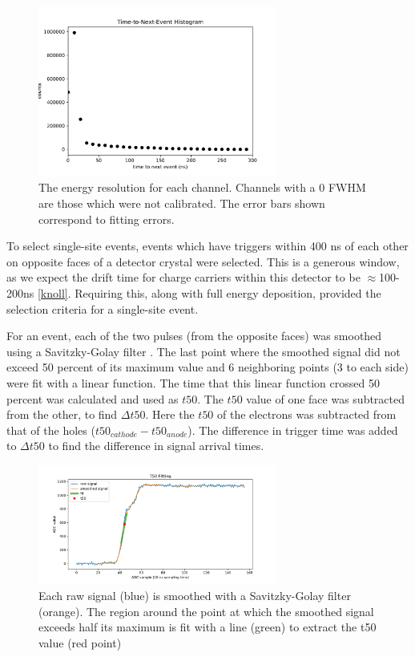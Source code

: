 \begin{figure}
\begin{centering}
\includegraphics[width=0.7\textwidth]{./figures/time-to-next-event.pdf}
\caption{The energy resolution for each channel. Channels with a 0 FWHM are those which were not calibrated. The error bars shown correspond to fitting errors.}
\label{timehist}
\end{centering}
\end{figure}

To select single-site events, events which have triggers within 400 ns of each other on opposite faces of a detector crystal were selected. This is a generous window, as we expect the drift time for charge carriers within this detector to be $\approx$100-200ns \ref{knoll}. Requiring this, along with full energy deposition, provided the selection criteria for a single-site event.

For an event, each of the two pulses (from the opposite faces) was smoothed using a Savitzky-Golay filter \cite{scipy}. The last point where the smoothed signal did not exceed 50 percent of its maximum value and 6 neighboring points (3 to each side) were fit with a linear function. The time that this linear function crossed 50 percent was calculated and used as $t50$. The $t50$ value of one face was subtracted from the other, to find $\Delta t50$. Here the $t50$ of the electrons was subtracted from that of the holes ($t50_{cathode}- t50_{anode}$). The difference in trigger time was added to $\Delta t50$ to find the difference in signal arrival times.

\begin{figure}
\begin{centering}
\includegraphics[width=0.7\textwidth]{./figures/t50_fitting.pdf}
\caption{Each raw signal (blue) is smoothed with a Savitzky-Golay filter (orange). The region around the point at which the smoothed signal exceeds half its maximum is fit with a line (green) to extract the t50 value (red point)}
\label{fit}
\end{centering}
\end{figure}

